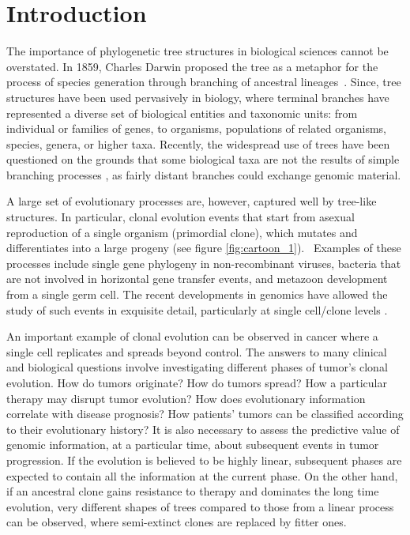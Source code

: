 \documentclass[a4paper,11pt]{article}
\begin{document}
\tableofcontents


\section{Introduction}

The importance of phylogenetic tree structures in biological sciences cannot be overstated.
In 1859, Charles Darwin proposed the tree as a metaphor for the process of species generation through branching of ancestral lineages~\cite{darwin1859origin}.
Since, tree structures have been used pervasively in biology, where terminal branches have represented a diverse set of biological entities and taxonomic units: from individual or families of genes, to organisms, populations of related organisms, species, genera, or higher taxa. Recently, the widespread use of trees have been questioned on the grounds that some biological taxa are not the results of simple branching processes \cite{doolittle1999phylogenetic, chan2013topology}, as fairly distant branches could exchange genomic material.

A large set of evolutionary processes are, however, captured well by tree-like structures.
In particular, clonal evolution events that start from asexual reproduction of a single organism (primordial clone), which mutates and differentiates into a large progeny (see figure \ref{fig:cartoon_1}).~\cite{khiabanian2014viral}
Examples of these processes include single gene phylogeny in non-recombinant viruses, bacteria that are not involved in horizontal gene transfer events, and metazoon development from a single germ cell.
The recent developments in genomics have allowed the study of such events in exquisite detail, particularly at single cell/clone levels \cite{navin2011tumour, shalek2013single, eirew2014dynamics}.

An important example of clonal evolution can be observed in cancer where a single cell replicates and spreads beyond control.
The answers to many clinical and biological questions involve investigating different phases of tumor's clonal evolution. How do tumors originate? How do tumors spread? How a particular therapy may disrupt tumor evolution? How does evolutionary information correlate with disease prognosis? How patients' tumors can be classified according to their evolutionary history?
It is also necessary to assess the predictive value of genomic information, at a particular time, about subsequent events in tumor progression.
If the evolution is believed to be highly linear, subsequent phases are expected to contain all the information at the current phase.
On the other hand, if an ancestral clone gains resistance to therapy and dominates the long time evolution, very different shapes of trees compared to those from a linear process can be observed, where semi-extinct clones are replaced by fitter ones.
\end{document}
